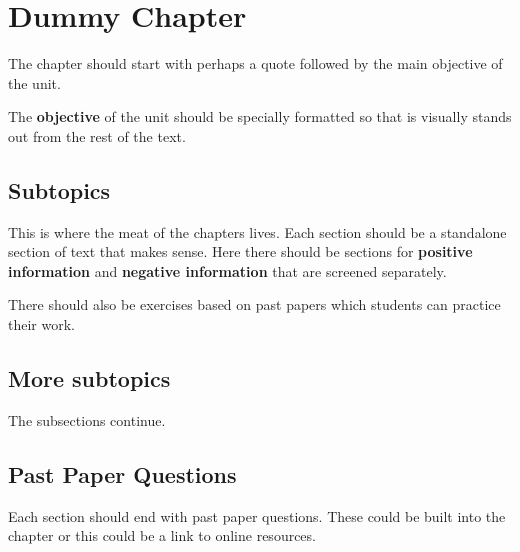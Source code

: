 \chapter{Dummy Chapter}

The chapter should start with perhaps a quote followed by the main objective of the unit. 

The \textbf{objective} of the unit should be specially formatted so that is visually stands out from the rest of the text.


\section{Subtopics}
This is where the meat of the chapters lives. Each section should be a standalone section of text that makes sense. Here there should be sections for \textbf{positive information} and \textbf{negative information} that are screened separately. 

There should also be exercises based on past papers which students can practice their work.



\section{More subtopics}

The subsections continue. 


\section{Past Paper Questions}

Each section should end with past paper questions. These could be built into the chapter or this could be a link to online resources.